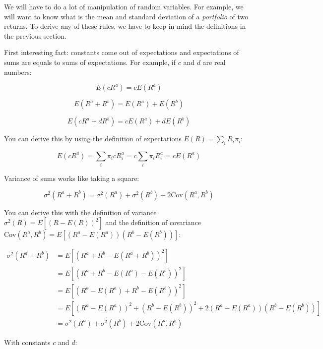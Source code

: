 We will have to do a lot of manipulation of random variables. 
For example, we will want to know what is the mean 
and standard deviation of a \textit{portfolio} of 
two returns. To derive any of these rules, we have to keep in mind
 the definitions in the previous section.

First interesting fact: constants come out of 
expectations and expectations of sums are equals 
to sums of expectations. For example, if $c$ and $d$
are real numbers:

\begin{equation}
    E(cR^a) = cE(R^a)
\end{equation}

\begin{equation}
    E(R^a + R^b) = E(R^a) + E(R^b)
\end{equation}

\begin{equation}
    E(cR^a + dR^b) = cE(R^a) + dE(R^b)
\end{equation}

You can derive this by using the definition of 
expectations $E(R) = \sum_i R_i \pi_i$:

\begin{equation}
    E(cR^a) = \sum_i \pi_i c R^a_i  = c\sum_i  \pi_i R^a_i = cE(R^a)
\end{equation}

Variance of sums works like taking a square:

\begin{equation}
    \sigma^2(R^a + R^b) = \sigma^2(R^a) + \sigma^2(R^b) + 2\text{Cov}(R^a, R^b)
\end{equation}

You can derive this with the definition of variance $\sigma^2(R) = E[(R - E(R))^2]$ and 
the definition of covariance $\text{Cov}(R^a, R^b) = E[(R^a - E(R^a))(R^b - E(R^b))]$:

\begin{align}
    \sigma^2(R^a + R^b) &= E[(R^a + R^b - E(R^a + R^b))^2] \\
    &= E[(R^a + R^b - E(R^a) - E(R^b))^2] \\
    &= E[(R^a - E(R^a) + R^b - E(R^b))^2] \\
    &= E[(R^a - E(R^a))^2 + (R^b - E(R^b))^2 + 2(R^a - E(R^a))(R^b - E(R^b))] \\
    &= \sigma^2(R^a) + \sigma^2(R^b) + 2\text{Cov}(R^a, R^b)
\end{align}

With constants $c$ and $d$:	

